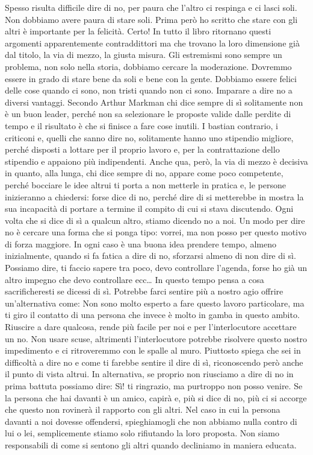 \documentclass[12pt]{book} %
\begin{document}
Spesso risulta difficile dire di no, per paura che l'altro ci respinga e ci lasci soli. Non
dobbiamo avere paura di stare soli. Prima però ho scritto che stare con gli altri è importante per la felicità. Certo!
In tutto il libro ritornano questi argomenti apparentemente contraddittori ma che trovano la loro dimensione già dal
titolo, la via di mezzo, la giusta misura. Gli estremismi sono sempre un problema, non solo nella storia, dobbiamo
cercare la moderazione. Dovremmo essere in grado di stare bene da soli e bene con la gente. Dobbiamo essere felici
delle cose quando ci sono, non tristi quando non ci sono. Imparare a dire no a diversi vantaggi. Secondo Arthur Markman
chi dice sempre di sì solitamente non è un buon leader, perché non sa selezionare le proposte valide dalle perdite di
tempo e il risultato è che si finisce a fare cose inutili. I bastian contrario, i criticoni e, quelli che sanno dire
no, solitamente hanno uno stipendio migliore, perché disposti a lottare per il proprio lavoro e, per la contrattazione
dello stipendio e appaiono più indipendenti. Anche qua, però, la via di mezzo è decisiva in quanto, alla lunga, chi
dice sempre di no, appare come poco competente, perché bocciare le idee altrui ti porta a non metterle in pratica e, le
persone inizieranno a chiedersi: forse dice di no, perché dire di si metterebbe in mostra la sua incapacità di portare
a termine il compito di cui si stava discutendo. Ogni volta che si dice di sì a qualcun altro, stiamo dicendo no a noi.
Un modo per dire no è cercare una forma che si ponga tipo: vorrei, ma non posso per questo motivo di forza maggiore. In
ogni caso è una buona idea prendere tempo, almeno inizialmente, quando si fa fatica a dire di no, sforzarsi almeno di
non dire di sì. Possiamo dire, ti faccio sapere tra poco, devo controllare l'agenda, forse ho già
un altro impegno che devo controllare ecc… In questo tempo pensa a cosa sacrificheresti se dicessi di sì. Potrebbe
farci sentire più a nostro agio offrire un'alternativa come: Non sono molto esperto a fare questo
lavoro particolare, ma ti giro il contatto di una persona che invece è molto in gamba in questo ambito. Riuscire a dare
qualcosa, rende più facile per noi e per l'interlocutore accettare un no. Non usare scuse,
altrimenti l'interlocutore potrebbe risolvere questo nostro impedimento e ci ritroveremmo con le
spalle al muro. Piuttosto spiega che sei in difficoltà a dire no e come ti farebbe sentire il dire di sì, riconoscendo
però anche il punto di vista altrui. In alternativa, se proprio non riusciamo a dire di no in prima battuta possiamo
dire: Sì! ti ringrazio, ma purtroppo non posso venire. Se la persona che hai davanti è un amico, capirà e, più si dice
di no, più ci si accorge che questo non rovinerà il rapporto con gli altri. Nel caso in cui la persona davanti a noi
dovesse offendersi, spieghiamogli che non abbiamo nulla contro di lui o lei, semplicemente stiamo solo rifiutando la
loro proposta. Non siamo responsabili di come si sentono gli altri quando decliniamo in maniera educata.
\end{document}
